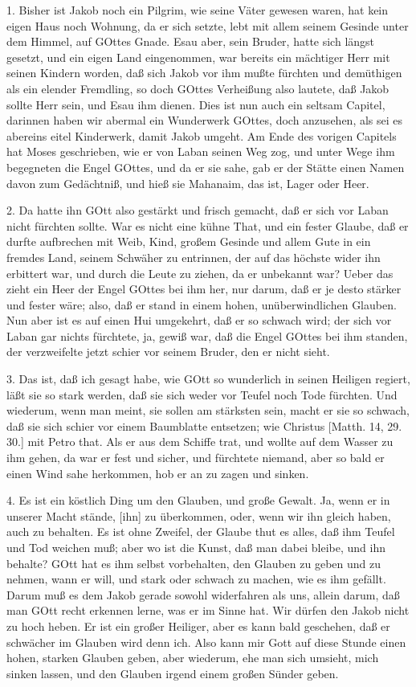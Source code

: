1. Bisher ist Jakob noch ein Pilgrim, wie seine Väter gewesen waren, hat kein eigen Haus noch Wohnung, da er sich setzte, lebt mit allem seinem Gesinde unter dem Himmel, auf GOttes Gnade. Esau aber, sein Bruder, hatte sich längst gesetzt, und ein eigen Land eingenommen, war bereits ein mächtiger Herr mit seinen Kindern worden, daß sich Jakob vor ihm mußte fürchten und demüthigen als ein elender Fremdling, so doch GOttes Verheißung also lautete, daß Jakob sollte Herr sein, und Esau ihm dienen. Dies ist nun auch ein seltsam Capitel, darinnen haben wir abermal ein Wunderwerk GOttes, doch anzusehen, als sei es abereins eitel Kinderwerk, damit Jakob umgeht. Am Ende des vorigen Capitels hat Moses geschrieben, wie er von Laban seinen Weg zog, und unter Wege ihm begegneten die Engel GOttes, und da er sie sahe, gab er der Stätte einen Namen davon zum Gedächtniß, und hieß sie Mahanaim, das ist, Lager oder Heer.

2. Da hatte ihn GOtt also gestärkt und frisch gemacht, daß er sich vor Laban nicht fürchten sollte. War es nicht eine kühne That, und ein fester Glaube, daß er durfte aufbrechen mit Weib, Kind, großem Gesinde und allem Gute in ein fremdes Land, seinem Schwäher zu entrinnen, der auf das höchste wider ihn erbittert war, und durch die Leute zu ziehen, da er unbekannt
war? Ueber das zieht ein Heer der Engel GOttes bei ihm her, nur darum, daß er je desto stärker und fester wäre; also, daß er stand in einem hohen, unüberwindlichen Glauben. Nun aber ist es auf einen Hui umgekehrt, daß er so schwach wird; der sich vor Laban gar nichts fürchtete, ja, gewiß war, daß die Engel GOttes bei ihm standen, der verzweifelte jetzt schier vor seinem Bruder, den er nicht sieht.

3. Das ist, daß ich gesagt habe, wie GOtt so wunderlich in seinen Heiligen regiert, läßt sie so stark werden, daß sie sich weder vor Teufel noch Tode fürchten. Und wiederum, wenn man meint, sie sollen am stärksten sein, macht er sie so schwach, daß sie sich schier vor einem Baumblatte entsetzen; wie Christus [Matth. 14, 29. 30.] mit Petro that. Als er aus dem Schiffe trat, und wollte auf dem Wasser zu ihm gehen, da war er fest und sicher, und fürchtete niemand, aber so bald er einen Wind sahe herkommen, hob er an zu zagen und sinken.

4. Es ist ein köstlich Ding um den Glauben, und große Gewalt. Ja, wenn er in unserer Macht stände, [ihn] zu überkommen, oder, wenn wir ihn gleich haben, auch zu behalten. Es ist ohne Zweifel, der Glaube thut es alles, daß ihm Teufel und Tod weichen muß; aber wo ist die Kunst, daß man dabei bleibe, und ihn behalte? GOtt hat es ihm selbst vorbehalten, den Glauben zu geben und zu nehmen, wann er will, und stark oder schwach zu machen, wie es ihm gefällt. Darum muß es dem Jakob gerade sowohl widerfahren als uns, allein darum, daß man GOtt recht erkennen lerne, was er im Sinne hat. Wir dürfen den Jakob nicht zu hoch heben. Er ist ein großer Heiliger, aber es kann bald geschehen, daß er schwächer im Glauben wird denn ich. Also kann mir Gott auf diese Stunde einen hohen, starken Glauben geben, aber wiederum, ehe man sich umsieht, mich sinken lassen, und den Glauben irgend einem großen Sünder geben.

